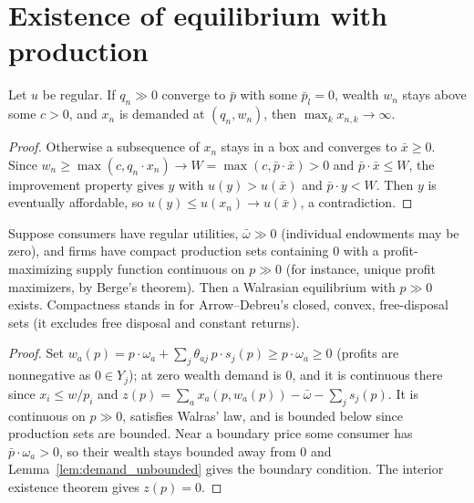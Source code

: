 \section{Existence of equilibrium with production}
\label{sec:existence_production}

\begin{lemma}
\label{lem:demand_unbounded}
\leanok
{}
Let $u$ be regular. If $q_n \gg 0$ converge to $\bar p$ with some $\bar p_l = 0$, wealth $w_n$ stays above some $c > 0$, and
$x_n$ is demanded at $(q_n, w_n)$, then $\max_k x_{n,k} \to \infty$.
\end{lemma}
\begin{proof}
\leanok
Otherwise a subsequence of $x_n$ stays in a box and converges to $\bar x \ge 0$. Since $w_n \ge \max(c, q_n \cdot x_n) \to
W = \max(c, \bar p \cdot \bar x) > 0$ and $\bar p \cdot \bar x \le W$, the improvement property gives $y$ with $u(y) > u(\bar x)$
and $\bar p \cdot y < W$. Then $y$ is eventually affordable, so $u(y) \le u(x_n) \to u(\bar x)$, a contradiction.
\end{proof}

\begin{theorem}
\label{thm:existence_production}
\leanok
{}
Suppose consumers have regular utilities, $\bar\omega \gg 0$ (individual endowments may be zero), and firms have compact production
sets containing $0$ with a profit-maximizing supply function continuous on $p \gg 0$ (for instance, unique profit
maximizers, by Berge's theorem). Then a Walrasian equilibrium with $p \gg 0$ exists. Compactness stands in for
Arrow--Debreu's closed, convex, free-disposal sets (it excludes free disposal and constant returns).
\end{theorem}
\begin{proof}
\leanok
Set $w_a(p) = p\cdot\omega_a + \sum_j \theta_{aj}\, p \cdot s_j(p) \ge p \cdot \omega_a \ge 0$ (profits are nonnegative as
$0 \in Y_j$); at zero wealth demand is $0$, and it is continuous there since $x_i \le w/p_i$ and $z(p) = \sum_a x_a(p, w_a(p)) - \bar\omega - \sum_j s_j(p)$. It is continuous on $p \gg 0$, satisfies
Walras' law, and is bounded below since production sets are bounded. Near a boundary price some consumer has
$\bar p \cdot \omega_a > 0$, so their wealth stays bounded away from $0$ and Lemma~\ref{lem:demand_unbounded} gives the
boundary condition. The interior existence theorem gives $z(p) = 0$.
\end{proof}

